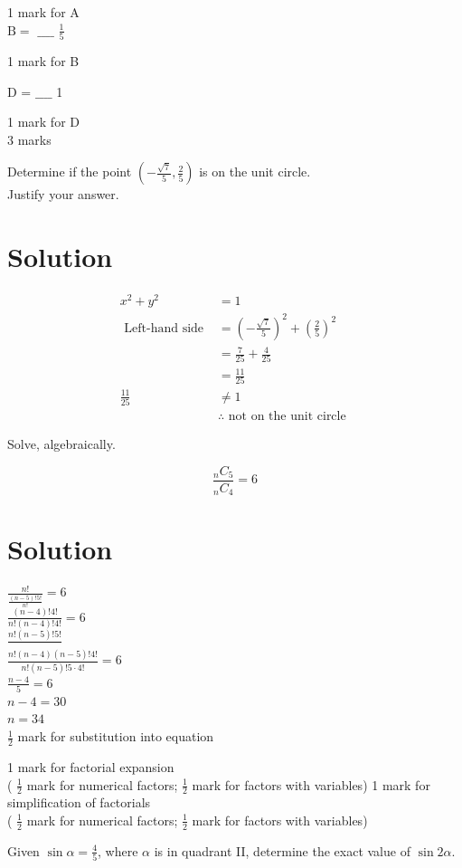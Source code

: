 \documentclass[10pt]{article}
\begin{document}
1 mark for A\\
$\mathrm{B}=$ $\_\_\_\_$ $\frac{1}{5}$

1 mark for B

D = $\_\_\_\_$ 1

1 mark for D\\
3 marks

Determine if the point $\left(-\frac{\sqrt{7}}{5}, \frac{2}{5}\right)$ is on the unit circle.\\
Justify your answer.

\section*{Solution}
$$
\begin{aligned}
x^{2}+y^{2} & =1 \\
\text { Left-hand side } & =\left(-\frac{\sqrt{7}}{5}\right)^{2}+\left(\frac{2}{5}\right)^{2} \\
& =\frac{7}{25}+\frac{4}{25} \\
& =\frac{11}{25} \\
\frac{11}{25} & \neq 1 \\
& \therefore \text { not on the unit circle }
\end{aligned}
$$

Solve, algebraically.

$$
\frac{{ }_{n} C_{5}}{{ }_{n} C_{4}}=6
$$

\section*{Solution}
$\frac{n!}{\frac{(n-5)!5!}{n!}}=6$\\
$\frac{(n-4)!4!}{n!(n-4)!4!}=6$\\
$\frac{n!(n-5)!5!}{}$\\
$\frac{n!(n-4)(n-5)!4!}{n!(n-5)!5 \cdot 4!}=6$\\
$\frac{n-4}{5}=6$\\
$n-4=30$\\
$n=34$\\
$\frac{1}{2}$ mark for substitution into equation

1 mark for factorial expansion\\
( $\frac{1}{2}$ mark for numerical factors; $\frac{1}{2}$ mark for factors with variables) 1 mark for simplification of factorials\\
( $\frac{1}{2}$ mark for numerical factors; $\frac{1}{2}$ mark for factors with variables)

Given $\sin \alpha=\frac{4}{5}$, where $\alpha$ is in quadrant II, determine the exact value of $\sin 2 \alpha$.
\end{document}
